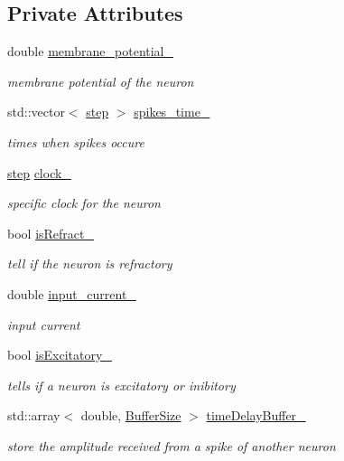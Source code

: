 \subsection*{Private Attributes}
\begin{DoxyCompactItemize}
\item 
double \hyperlink{classNeuron_a58829bf280bb52776e8842c71a92af4a}{membrane\-\_\-potential\-\_\-}
\begin{DoxyCompactList}\small\item\em membrane potential of the neuron \end{DoxyCompactList}\item 
std\-::vector$<$ \hyperlink{constant_8hpp_a58a8d380569868e765017aef9c749646}{step} $>$ \hyperlink{classNeuron_aff71dff6bedb3ca0a516e42c69046853}{spikes\-\_\-time\-\_\-}
\begin{DoxyCompactList}\small\item\em times when spikes occure \end{DoxyCompactList}\item 
\hyperlink{constant_8hpp_a58a8d380569868e765017aef9c749646}{step} \hyperlink{classNeuron_a87cd75cf2bbc61ad44535f96541db4ab}{clock\-\_\-}
\begin{DoxyCompactList}\small\item\em specific clock for the neuron \end{DoxyCompactList}\item 
bool \hyperlink{classNeuron_a9c444314a4bcd7fe375dbc8243069e14}{is\-Refract\-\_\-}
\begin{DoxyCompactList}\small\item\em tell if the neuron is refractory \end{DoxyCompactList}\item 
double \hyperlink{classNeuron_af517fe863209cf8743ce417613004b44}{input\-\_\-current\-\_\-}
\begin{DoxyCompactList}\small\item\em input current \end{DoxyCompactList}\item 
bool \hyperlink{classNeuron_af4443f35a3ffae3e97d68a72fb11c68d}{is\-Excitatory\-\_\-}
\begin{DoxyCompactList}\small\item\em tells if a neuron is excitatory or inibitory \end{DoxyCompactList}\item 
std\-::array$<$ double, \hyperlink{classNeuron_a9c8a61b96478817e5c9f5731d08eb451}{Buffer\-Size} $>$ \hyperlink{classNeuron_afec65fc094e852787c33c5af93d1997b}{time\-Delay\-Buffer\-\_\-}
\begin{DoxyCompactList}\small\item\em store the amplitude received from a spike of another neuron \end{DoxyCompactList}\end{DoxyCompactItemize}
